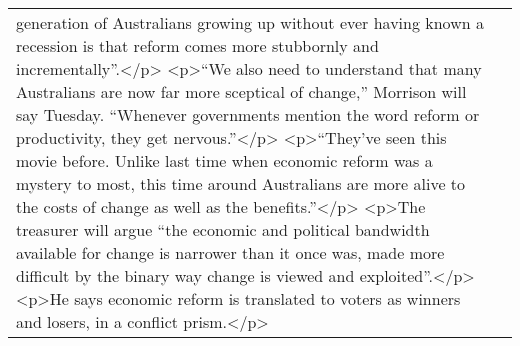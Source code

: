 \documentclass[]{article}
\begin{document}
\begin{table}[!h]
{\begin{tabular}[t]{ll}
generation of Australians growing up without ever having known a recession is that reform comes more stubbornly and incrementally”.</p> <p>“We also need to understand that many Australians are now far more sceptical of change,” Morrison will say Tuesday. “Whenever governments mention the word reform or productivity, they get nervous.”</p> <p>“They’ve seen this movie before. Unlike last time when economic reform was a mystery to most, this time around Australians are more alive to the costs of change as well as the benefits.”</p> <p>The treasurer will argue “the economic and political bandwidth available for change is narrower than it once was, made more difficult by the binary way change is viewed and exploited”.</p> <p>He says economic reform is translated to voters as winners and losers, in a conflict prism.</p>\\

\end{tabular}}
\end{table}
\end{document}
